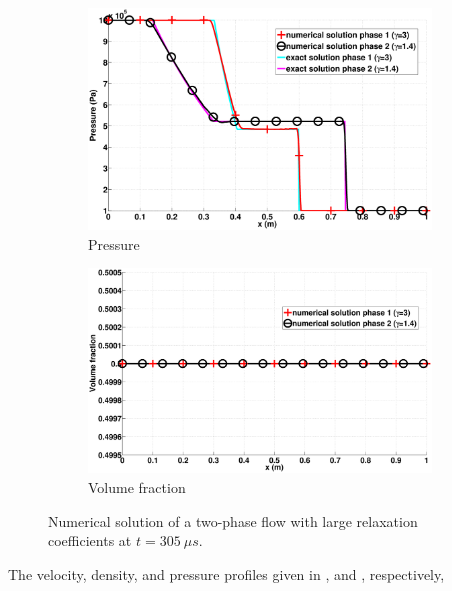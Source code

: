 \documentclass[preprint,10pt]{elsarticle}
\begin{document}
\begin{figure}[H]
        \begin{subfigure}[b]{0.495\textwidth}
                \centering
                \includegraphics[width=\textwidth]{figures/two_phases_pressure.eps}
                \caption{Pressure}
                \label{fig:indp-phase-press}
        \end{subfigure}        
        \begin{subfigure}[b]{0.495\textwidth}
                \centering
                \includegraphics[width=\textwidth]{figures/two_phases_volume_fraction.eps}
                \caption{Volume fraction}
                \label{fig:indp-phase-vf}
        \end{subfigure}
        \caption{Numerical solution of a two-phase flow with large relaxation coefficients at $t=305 \ \mu s$.}\label{fig:indp-phase-variables}
\end{figure}
%
The velocity, density, and pressure profiles given in ,  and , respectively, 
\end{document}
